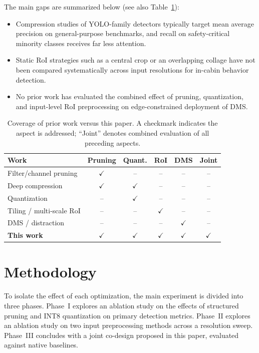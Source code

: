\documentclass[conference]{IEEEtran}
\begin{document}
The main gaps are summarized below (see also Table~\ref{tab:gap}):
\begin{itemize}
    \item Compression studies of YOLO-family detectors typically target mean average precision on general-purpose benchmarks, and recall on safety-critical minority classes receives far less attention.
    \item Static RoI strategies such as a central crop or an overlapping collage have not been compared systematically across input resolutions for in-cabin behavior detection.
    \item No prior work has evaluated the combined effect of pruning, quantization, and input-level RoI preprocessing on edge-constrained deployment of DMS.
\end{itemize}
\begin{table}[t]
\caption{Coverage of prior work versus this paper. A checkmark indicates the aspect is addressed; ``Joint'' denotes combined evaluation of all preceding aspects.}
\label{tab:gap}
\centering
\footnotesize
\setlength{\tabcolsep}{3pt}
\begin{tabular}{@{}lccccc@{}}
\toprule
\textbf{Work} & \textbf{Pruning} & \textbf{Quant.} & \textbf{RoI} & \textbf{DMS} & \textbf{Joint} \\
\midrule
Filter/channel pruning \cite{b9,b10,b11,b12} & $\checkmark$ & -- & -- & -- & -- \\
Deep compression \cite{b8}                   & $\checkmark$ & $\checkmark$ & -- & -- & -- \\
Quantization \cite{b13,b14}                  & -- & $\checkmark$ & -- & -- & -- \\
Tiling / multi-scale RoI \cite{b18,b19}      & -- & -- & $\checkmark$ & -- & -- \\
DMS / distraction \cite{b20,b21,b22}         & -- & -- & -- & $\checkmark$ & -- \\
\midrule
\textbf{This work} & $\checkmark$ & $\checkmark$ & $\checkmark$ & $\checkmark$ & $\checkmark$ \\
\bottomrule
\end{tabular}
\end{table}


\section{Methodology}

To isolate the effect of each optimization, the main experiment is divided into three phases. Phase~I explores an ablation study on the effects of structured pruning and INT8 quantization on primary detection metrics. Phase~II explores an ablation study on two input preprocessing methods across a resolution sweep. Phase~III concludes with a joint co-design proposed in this paper, evaluated against native baselines.
\end{document}
